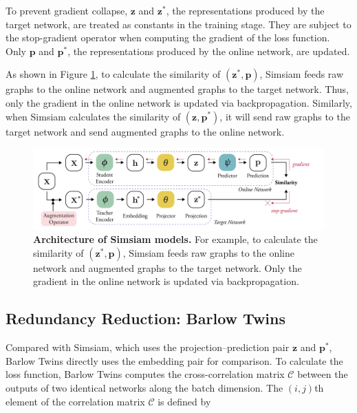 To prevent gradient collapse, $\textbf{z}$ and $\textbf{z}^{*}$, the representations produced by the target network, are treated as constants in the training stage. They are subject to the stop-gradient operator when computing the gradient of the loss function. Only $\mathbf{p}$ and $\mathbf{p}^{*}$, the representations produced by the online network, are updated.


As shown in Figure \ref{fig:arch-simsiam}, to calculate the similarity of $(\textbf{z}^{*},\textbf{p})$, Simsiam feeds raw graphs to the online network and augmented graphs to the target network. Thus, only the gradient in the online network is updated via backpropagation. Similarly, when Simsiam calculates the similarity of $(\textbf{z},\textbf{p}^{*})$, it will send raw graphs to the target network and send augmented graphs to the online network.




\begin{figure}[!htbp]
\includegraphics[width=1\textwidth]{./figures/model3_simsiam.png}
\vspace{0.5cm}
\caption[Architecture of Simsiam models]{\textbf{Architecture of Simsiam models.} For example, to calculate the similarity of $(\textbf{z}^{*},\textbf{p})$, Simsiam feeds raw graphs to the online network and augmented graphs to the target network. Only the gradient in the online network is updated via backpropagation.}
\label{fig:arch-simsiam}
\end{figure}





\subsection{Redundancy Reduction: Barlow Twins}

Compared with Simsiam, which uses the projection–prediction pair $\textbf{z}$ and $\textbf{p}^{*}$, Barlow Twins directly uses the embedding pair for comparison. To calculate the loss function, Barlow Twins \cite{bielak2021graph} computes the cross-correlation matrix $\mathcal{C}$ between the outputs of two identical networks along the batch dimension. The $(i,j)$th element of the correlation matrix $\mathcal{C}$ is defined by



